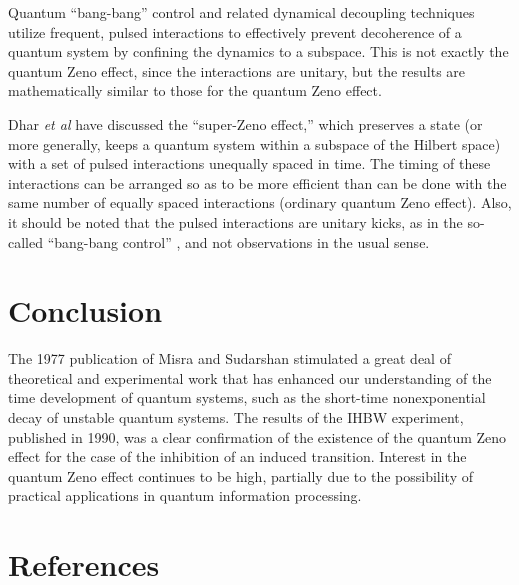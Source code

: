 \documentclass[letterpaper]{jpconf}
\begin{document}
Quantum ``bang-bang'' control and related dynamical decoupling
techniques \cite{viola98,viola99} utilize frequent, pulsed
interactions to effectively prevent decoherence of a quantum system
by confining the dynamics to a subspace.  This is not exactly the
quantum Zeno effect, since the interactions are unitary, but the
results are mathematically similar to those for the quantum Zeno
effect.

Dhar {\em et al} \cite{dhar06} have discussed the ``super-Zeno
effect,'' which preserves a state (or more generally, keeps a
quantum system within a subspace of the Hilbert space) with a set of
pulsed interactions unequally spaced in time.  The timing of these
interactions can be arranged so as to be more efficient than can be
done with the same number of equally spaced interactions (ordinary
quantum Zeno effect).  Also, it should be noted that the pulsed
interactions are unitary kicks, as in the so-called ``bang-bang
control'' \cite{viola98}, and not observations in the usual sense.


\section{Conclusion}

The 1977 publication of Misra and Sudarshan stimulated a great deal
of theoretical and experimental work that has enhanced our
understanding of the time development of quantum systems, such as
the short-time nonexponential decay of unstable quantum systems. The
results of the IHBW experiment, published in 1990, was a clear
confirmation of the existence of the quantum Zeno effect for the
case of the inhibition of an induced transition.  Interest in the
quantum Zeno effect continues to be high, partially due to the
possibility of practical applications in quantum information
processing.



\section*{References}
\end{document}
